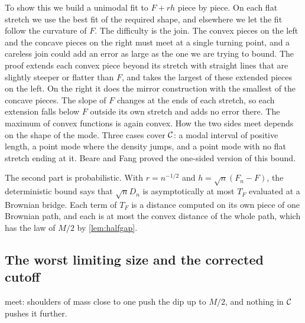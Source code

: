 To show this we build a unimodal fit to $F+rh$ piece by piece. On each flat stretch we use the best fit of the required shape, and elsewhere we let the fit follow the curvature of $F$. The difficulty is the join. The convex pieces on the left and the concave pieces on the right must meet at a single turning point, and a careless join could add an error as large as the one we are trying to bound. The proof extends each convex piece beyond its stretch with straight lines that are slightly steeper or flatter than $F$, and takes the largest of these extended pieces on the left. On the right it does the mirror construction with the smallest of the concave pieces. The slope of $F$ changes at the ends of each stretch, so each extension falls below $F$ outside its own stretch and adds no error there. The maximum of convex functions is again convex. How the two sides meet depends on the shape of the mode. Three cases cover $\mathcal{C}$: a modal interval of positive length, a point mode where the density jumps, and a point mode with no flat stretch ending at it. Beare and Fang \cite{BF17} proved the one-sided version of this bound.

The second part is probabilistic. With $r=n^{-1/2}$ and $h=\sqrt n(F_n-F)$, the deterministic bound says that $\sqrt nD_n$ is asymptotically at most $T_F$ evaluated at a Brownian bridge. Each term of $T_F$ is a distance computed on its own piece of one Brownian path, and each is at most the convex distance of the whole path, which has the law of $M/2$ by \cref{lem:halfgap}.

\subsection{The worst limiting size and the corrected cutoff}
 meet: shoulders of mass close to one push the dip up to $M/2$, and nothing in $\mathcal{C}$ pushes it further.

